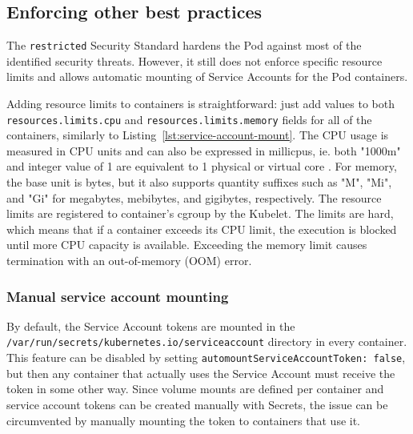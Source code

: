 \documentclass[english, 12pt, a4paper, sci, utf8, a-2b, online]{aaltothesis}
\begin{document}

\subsection{Enforcing other best practices}

The \texttt{restricted} Security Standard hardens the Pod against most of the identified security threats.
However, it still does not enforce specific resource limits and allows automatic mounting of Service Accounts for the Pod containers.

Adding resource limits to containers is straightforward: just add values to both \texttt{resources.limits.cpu} and \texttt{resources.limits.memory} fields for all of the containers, similarly to Listing~\ref{lst:service-account-mount}.
The CPU usage is measured in CPU units and can also be expressed in millicpus, ie. both "1000m" and integer value of 1 are equivalent to 1 physical or virtual core \cite{k8s-docs-resources}.
For memory, the base unit is bytes, but it also supports quantity suffixes such as "M", "Mi", and "Gi" for megabytes, mebibytes, and gigibytes, respectively.
The resource limits are registered to container's cgroup by the Kubelet.
The limits are hard, which means that if a container exceeds its CPU limit, the execution is blocked until more CPU capacity is available.
Exceeding the memory limit causes termination with an out-of-memory (OOM) error.

\subsubsection{Manual service account mounting}

By default, the Service Account tokens are mounted in the \texttt{/var/run/secrets/kubernetes.io/serviceaccount} directory in every container.
This feature can be disabled by setting \texttt{automountServiceAccountToken: false}, but then any container that actually uses the Service Account must receive the token in some other way.
Since volume mounts are defined per container and service account tokens can be created manually with Secrets, the issue can be circumvented by manually mounting the token to containers that use it.



\end{document}
